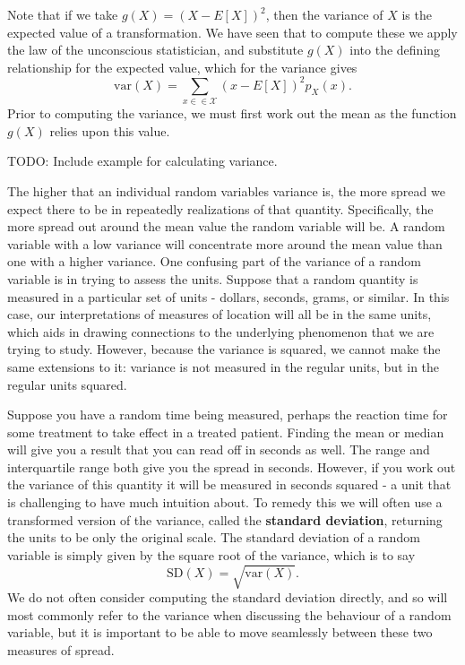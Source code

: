 \documentclass[
  letterpaper,
  DIV=11,
  numbers=noendperiod]{scrreprt}
\begin{document}
Note that if we take \(g(X) = (X-E[X])^2\), then the variance of \(X\)
is the expected value of a transformation. We have seen that to compute
these we apply the law of the unconscious statistician, and substitute
\(g(X)\) into the defining relationship for the expected value, which
for the variance gives
\[\text{var}(X) = \sum_{x\in\in\mathcal{X}} (x-E[X])^2p_X(x).\] Prior to
computing the variance, we must first work out the mean as the function
\(g(X)\) relies upon this value.

TODO: Include example for calculating variance.

The higher that an individual random variables variance is, the more
spread we expect there to be in repeatedly realizations of that
quantity. Specifically, the more spread out around the mean value the
random variable will be. A random variable with a low variance will
concentrate more around the mean value than one with a higher variance.
One confusing part of the variance of a random variable is in trying to
assess the units. Suppose that a random quantity is measured in a
particular set of units - dollars, seconds, grams, or similar. In this
case, our interpretations of measures of location will all be in the
same units, which aids in drawing connections to the underlying
phenomenon that we are trying to study. However, because the variance is
squared, we cannot make the same extensions to it: variance is not
measured in the regular units, but in the regular units squared.

Suppose you have a random time being measured, perhaps the reaction time
for some treatment to take effect in a treated patient. Finding the mean
or median will give you a result that you can read off in seconds as
well. The range and interquartile range both give you the spread in
seconds. However, if you work out the variance of this quantity it will
be measured in seconds squared - a unit that is challenging to have much
intuition about. To remedy this we will often use a transformed version
of the variance, called the \textbf{standard deviation}, returning the
units to be only the original scale. The standard deviation of a random
variable is simply given by the square root of the variance, which is to
say \[\text{SD}(X) = \sqrt{\text{var}(X)}.\] We do not often consider
computing the standard deviation directly, and so will most commonly
refer to the variance when discussing the behaviour of a random
variable, but it is important to be able to move seamlessly between
these two measures of spread.
\end{document}
